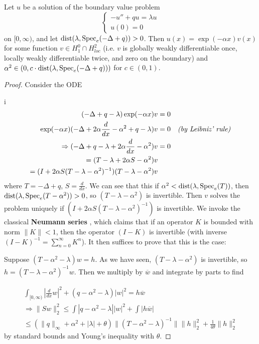 \documentclass[../main.tex]{subfiles}
\begin{document}
\begin{theorem}
  Let $u$ be a solution of the boundary
  value problem 
    $$ 
    \begin{cases}
	-u'' + qu = \lambda u \\
	u(0) = 0
    \end{cases} 
    $$ 
  on $[0, \infty)$, and let $\mathrm{dist}(\lambda, \mathrm{Spec}_e(-\Delta + q)) > 0$.
  Then $u(x) = \exp(-\alpha x) v(x)$ for some function $v \in H_1^0 \cap H^2_{loc}$
  (i.e. $v$ is globally weakly differentiable once, locally weakly differentiable twice,
  and zero on the boundary) and 
  $\alpha^2 \in (0, c\cdot\mathrm{dist}(\lambda, \mathrm{Spec}_e(-\Delta + q)))$
  for $c \in (0, 1)$.
\end{theorem}
\begin{proof} %
Consider the ODE

i\begin{align*} (-\Delta + q - \lambda)\exp(- \alpha x)v & = 0 & \\ \exp(- \alpha
	x)(-\Delta + 2 \alpha\frac{d}{dx} - \alpha^2 + q - \lambda)v & = 0 &
	\text{\emph{(by Leibniz' rule)}} \\ \Rightarrow (-\Delta + q - \lambda +
	2 \alpha\frac{d}{dx} - \alpha^2 )v & = 0 & \\ = (T - \lambda + 2 \alpha
S - \alpha^2 )v && \\ = (I + 2 \alpha S(T - \lambda - \alpha^2)^{-1})(T -
\lambda - \alpha^2)v \end{align*} where $T = -\Delta + q$, $S = \frac{d}{dx}$.
	We can see that this if $\alpha^2 < \mathrm{dist}(\lambda, \mathrm{Spec}_e(T))$,
	then $\mathrm{dist}(\lambda, \mathrm{Spec}_e(T - \alpha^2)) > 0$, so $(T -
	\lambda - \alpha^2)$ is invertible. Then $v$ solves the problem uniquely
	if $(I + 2 \alpha S(T - \lambda - \alpha^2)^{-1})$ is invertible. We
	invoke the classical \textbf{Neumann series} \cite{arveson2002short},
	which claims that if an operator $K$ is bounded with norm $\|K\|<1$,
	then the operator $(I - K)$ is invertible (with inverse $(I - K)^{-1} =
	\sum_{n=0}^\infty K^n$). It then suffices to prove that this is the
	case:

Suppose $(T - \alpha^2 - \lambda)w = h$. As we have seen, $(T - \lambda -
	\alpha^2)$ is invertible, so $h = (T - \lambda - \alpha^2)^{-1}w$. Then
	we multiply by $\overline{w}$ and integrate by parts to find

\begin{align*} \int_{[0, \infty)}|\frac{d}{dx}w|^2 + (q - \alpha^2 -
	\lambda)|w|^2 = h\overline{w} \\ \Rightarrow \|Sw\|^2_2 \leq \int |q -
	\alpha^2 - \lambda||w|^2 + \int |h\overline{w}| \\ \leq (\|q\|_\infty +
	\alpha^2 + |\lambda| + \theta)\|(T - \alpha^2 - \lambda)^{-1}\|\|h\|^2_2
	+ \frac{1}{4\theta} \|h\|^2_2 \end{align*} by standard bounds and
	Young's inequality with $\theta$.


\end{proof}
\end{document}
